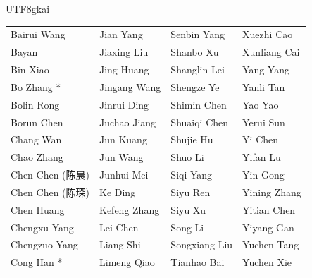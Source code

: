 \documentclass{article}
\begin{document}
\begin{CJK}{UTF8}{gkai}
\begin{tabular}{p{}p{}p{}p{}}
Bairui Wang & Jian Yang & Senbin Yang & Xuezhi Cao \\
Bayan & Jiaxing Liu & Shanbo Xu & Xunliang Cai \\
Bin Xiao & Jing Huang & Shanglin Lei & Yang Yang \\
Bo Zhang * & Jingang Wang & Shengze Ye & Yanli Tan \\
Bolin Rong & Jinrui Ding & Shimin Chen & Yao Yao \\
Borun Chen & Juchao Jiang & Shuaiqi Chen & Yerui Sun \\
Chang Wan & Jun Kuang & Shujie Hu & Yi Chen \\
Chao Zhang & Jun Wang & Shuo Li & Yifan Lu \\
Chen Chen (陈晨) & Junhui Mei & Siqi Yang & Yin Gong \\
Chen Chen (陈琛) & Ke Ding & Siyu Ren & Yining Zhang \\
Chen Huang & Kefeng Zhang & Siyu Xu & Yitian Chen \\
Chengxu Yang & Lei Chen & Song Li & Yiyang Gan \\
Chengzuo Yang & Liang Shi & Songxiang Liu & Yuchen Tang \\
Cong Han * & Limeng Qiao & Tianhao Bai & Yuchen Xie \\

\end{tabular}
\end{CJK}
\end{document}
